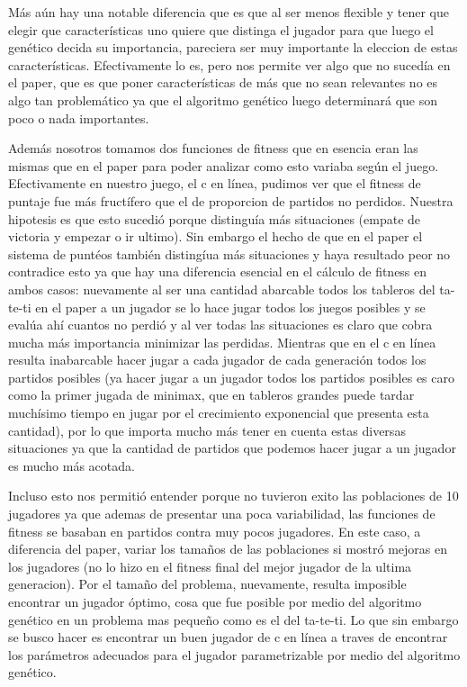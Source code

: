 \documentclass[A4paper,oneside,fleqn,11pt]{article}
\theoremstyle{definition}
\begin{document}
Más aún hay una notable diferencia que es que al ser menos flexible y tener que elegir que características uno quiere que distinga el jugador para que luego el genético decida su importancia, pareciera ser muy importante la eleccion de estas características. Efectivamente lo es, pero nos permite ver algo que no sucedía en el paper, que es que poner características de más que no sean relevantes no es algo tan problemático ya que el algoritmo genético luego determinará que son poco o nada importantes. 

Además nosotros tomamos dos funciones de fitness que en esencia eran las mismas que en el paper para poder analizar como esto variaba según el juego. Efectivamente en nuestro juego, el c en línea, pudimos ver que el fitness de puntaje fue más fructífero que el de proporcion de partidos no perdidos. Nuestra hipotesis es que esto sucedió porque distinguía más situaciones (empate de victoria y empezar o ir ultimo). Sin embargo el hecho de que en el paper el sistema de puntéos también distingíua más situaciones y haya resultado peor no contradice esto ya que hay una diferencia esencial en el cálculo de fitness en ambos casos: nuevamente al ser una cantidad abarcable todos los tableros del ta-te-ti en el paper a un jugador se lo hace jugar todos los juegos posibles y se evalúa ahí cuantos no perdió y al ver todas las situaciones es claro que cobra mucha más importancia minimizar las perdidas. Mientras que en el c en línea resulta inabarcable hacer jugar a cada jugador de cada generación todos los partidos posibles (ya hacer jugar a un jugador todos los partidos posibles es caro como la primer jugada de minimax, que en tableros grandes puede tardar muchísimo tiempo en jugar por el crecimiento exponencial que presenta esta cantidad), por lo que importa mucho más tener en cuenta estas diversas situaciones ya que la cantidad de partidos que podemos hacer jugar a un jugador es mucho más acotada.

Incluso esto nos permitió entender porque no tuvieron exito las poblaciones de 10 jugadores ya que ademas de presentar una poca variabilidad, las funciones de fitness se basaban en partidos contra muy pocos jugadores. En este caso, a diferencia del paper, variar los tamaños de las poblaciones si mostró mejoras en los jugadores (no lo hizo en el fitness final del mejor jugador de la ultima generacion). Por el tamaño del problema, nuevamente, resulta imposible encontrar un jugador óptimo, cosa que fue posible por medio del algoritmo genético en un problema mas pequeño como es el del ta-te-ti. Lo que sin embargo se busco hacer es encontrar un buen jugador de c en línea a traves de encontrar los parámetros adecuados para el jugador parametrizable por medio del algoritmo genético.
\end{document}
